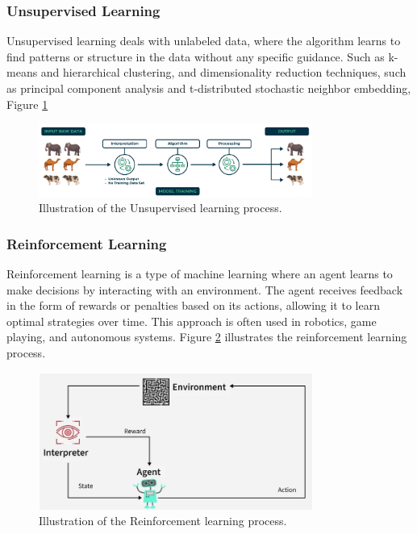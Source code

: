 \subsubsection{Unsupervised Learning}
Unsupervised learning deals with unlabeled data, where the algorithm learns to find patterns or
structure in the data without any specific guidance. Such as k-means and hierarchical
clustering, and dimensionality reduction techniques, such as principal component analysis
and t-distributed stochastic neighbor embedding,  Figure \ref{fig:unsuperml}
\begin{figure}[H]
  \centering
  \includegraphics[width=0.8\textwidth]{Images/Chapter1/unsuperml.png}
  \caption{Illustration of the Unsupervised learning process.\cite{geeksforgeeks2025supervised} }
  \label{fig:unsuperml}
\end{figure}

\subsubsection{Reinforcement Learning}
Reinforcement learning is a type of machine learning where an agent learns to make decisions by interacting with an environment. The agent receives feedback in the form of rewards or penalties based on its actions, allowing it to learn optimal strategies over time. This approach is often used in robotics, game playing, and autonomous systems. Figure \ref{fig:reinforcement} illustrates the reinforcement learning process.
\begin{figure}[H]
  \centering
  \includegraphics[width=0.8\textwidth]{Images/Chapter1/reinforcement.png}
  \caption{Illustration of the Reinforcement learning process.\cite{geeksforgeeks2025supervised} }
  \label{fig:reinforcement}
\end{figure}


